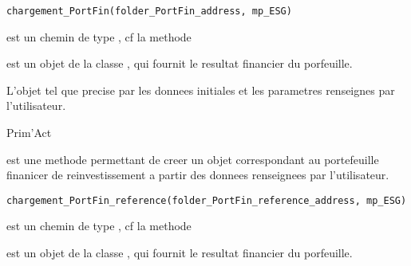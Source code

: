 \documentclass[a4paper]{book}
\begin{document}
%
\begin{Usage}
\begin{verbatim}
chargement_PortFin(folder_PortFin_address, mp_ESG)
\end{verbatim}
\end{Usage}
%
\begin{Arguments}
\begin{ldescription}
\item[\code{folder\_PortFin\_address}] est un chemin de type , cf la methode 

\item[\code{mp\_ESG}] est un objet de la classe , qui fournit le resultat financier du porfeuille.
\end{ldescription}
\end{Arguments}
%
\begin{Value}
L'objet  tel que precise par les donnees initiales et les parametres renseignes par l'utilisateur.
\end{Value}
%
\begin{Author}\relax
Prim'Act
\end{Author}
%
\begin{Description}\relax
{} est une methode permettant de creer un objet  correspondant au portefeuille finanicer de reinvestissement
a partir des donnees renseignees par l'utilisateur.
\end{Description}
%
\begin{Usage}
\begin{verbatim}
chargement_PortFin_reference(folder_PortFin_reference_address, mp_ESG)
\end{verbatim}
\end{Usage}
%
\begin{Arguments}
\begin{ldescription}
\item[\code{folder\_PortFin\_reference\_address}] est un chemin de type , cf la methode 

\item[\code{mp\_ESG}] est un objet de la classe , qui fournit le resultat financier du porfeuille.
\end{ldescription}
\end{Arguments}
\end{document}
